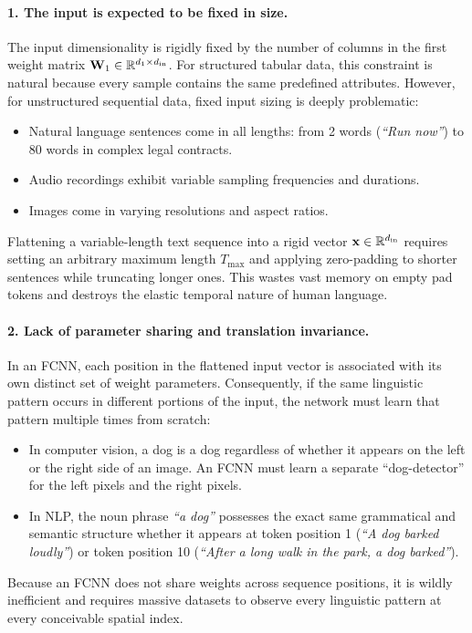 \documentclass[../../main.tex]{subfiles}
\begin{document}
\paragraph{1. The input is expected to be fixed in size.}
The input dimensionality is rigidly fixed by the number of columns in the first weight matrix $\mathbf{W}_1 \in \mathbb{R}^{d_1 \times d_{\text{in}}}$. For structured tabular data, this constraint is natural because every sample contains the same predefined attributes. However, for unstructured sequential data, fixed input sizing is deeply problematic:
\begin{itemize}
    \item Natural language sentences come in all lengths: from 2 words (\textit{``Run now''}) to 80 words in complex legal contracts.
    \item Audio recordings exhibit variable sampling frequencies and durations.
    \item Images come in varying resolutions and aspect ratios.
\end{itemize}
Flattening a variable-length text sequence into a rigid vector $\mathbf{x} \in \mathbb{R}^{d_{\text{in}}}$ requires setting an arbitrary maximum length $T_{\max}$ and applying zero-padding to shorter sentences while truncating longer ones. This wastes vast memory on empty pad tokens and destroys the elastic temporal nature of human language.

\paragraph{2. Lack of parameter sharing and translation invariance.}
In an FCNN, each position in the flattened input vector is associated with its own distinct set of weight parameters. Consequently, if the same linguistic pattern occurs in different portions of the input, the network must learn that pattern multiple times from scratch:
\begin{itemize}
    \item In computer vision, a dog is a dog regardless of whether it appears on the left or the right side of an image. An FCNN must learn a separate ``dog-detector'' for the left pixels and the right pixels.
    \item In NLP, the noun phrase \textit{``a dog''} possesses the exact same grammatical and semantic structure whether it appears at token position 1 (\textit{``A dog barked loudly''}) or token position 10 (\textit{``After a long walk in the park, a dog barked''}).
\end{itemize}
Because an FCNN does not share weights across sequence positions, it is wildly inefficient and requires massive datasets to observe every linguistic pattern at every conceivable spatial index.
\end{document}
